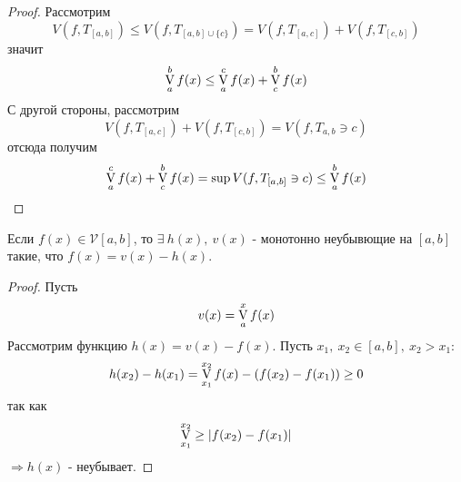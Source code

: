 \begin{proof}
    Рассмотрим 
    \[V(f,T_{[a,b]})\leq V(f, T_{[a,b]\cup \{c\}})=V(f, T_{[a,c]})+V(f,T_{[c,b]})\]
    значит
    \[\operatorname*{V}\limits_{a}^{b} f(x)\leq \operatorname*{V}\limits_{a}^{c} f(x)+\operatorname*{V}\limits_{c}^{b} f(x)\]
    С другой стороны, рассмотрим 
    \[V(f, T_{[a,c]})+V(f, T_{[c,b]})=V(f, T_{a,b}\ni c)\]
    отсюда получим
    \[\operatorname*{V}\limits_{a}^{c}f(x)+\operatorname*{V}\limits_{c}^{b}f(x)=\sup V(f,T_{[a,b]}\ni c)\leq \operatorname*{V}\limits_{a}^{b} f(x)\] 
\end{proof} 
\setcounter{thmcount}{0}
\begin{theorem}
    Если $f(x)\in \mathcal{V}[a,b]$, то $\exists\ h(x),\ v(x)$ - монотонно неубывющие на $[a,b]$ такие, что $f(x)=v(x)-h(x)$.
\end{theorem} 
\begin{proof}
    Пусть
    \[v(x)=\operatorname*{V}\limits_{a}^{x} f(x)\]
    Рассмотрим функцию $h(x)=v(x)-f(x)$. Пусть $x_1,\ x_2\in [a,b],\ x_2>x_1$:
    \[h(x_2)-h(x_1)=\operatorname*{V}\limits_{x_1}^{x_2}f(x)-(f(x_2)-f(x_1))\geq 0\]
    так как 
    \[\operatorname*{V}\limits_{x_1}^{x_2}\geq|f(x_2)-f(x_1)|\]
    $\Rightarrow h(x)$ - неубывает.
\end{proof} 
